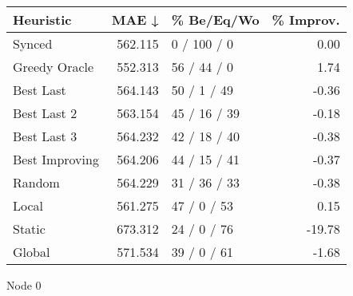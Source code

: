 \begin{tabular}{lrlr}
\toprule
\textbf{Heuristic} & \textbf{MAE ↓} & \textbf{\% Be/Eq/Wo} & \textbf{\% Improv.} \\
\midrule
            Synced &        562.115 &          0 / 100 / 0 &                0.00 \\
     Greedy Oracle &        552.313 &          56 / 44 / 0 &                1.74 \\
         Best Last &        564.143 &          50 / 1 / 49 &               -0.36 \\
       Best Last 2 &        563.154 &         45 / 16 / 39 &               -0.18 \\
       Best Last 3 &        564.232 &         42 / 18 / 40 &               -0.38 \\
    Best Improving &        564.206 &         44 / 15 / 41 &               -0.37 \\
            Random &        564.229 &         31 / 36 / 33 &               -0.38 \\
             Local &        561.275 &          47 / 0 / 53 &                0.15 \\
            Static &        673.312 &          24 / 0 / 76 &              -19.78 \\
            Global &        571.534 &          39 / 0 / 61 &               -1.68 \\
\bottomrule
\end{tabular}
\caption{Node 0}
\label{tab:iid_lr05_le2_bs2_0}
